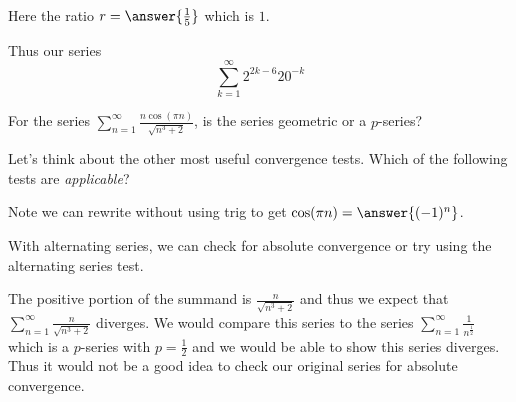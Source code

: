\documentclass{ximera}
\begin{document}
\begin{exercise}
\begin{hint}
\begin{question}
\begin{multipleChoice}
\end{multipleChoice}

Here the ratio $r= \answer{\frac{1}{5}}$ which is  $1$. 

Thus our series
\[
\sum_{k=1}^{\infty} 2^{2k-6}20^{-k}
\]

\begin{multipleChoice}
\end{multipleChoice}

\end{question}

\begin{question}

For the series $\sum_{n=1}^{\infty} \frac{n\cos(\pi n)}{\sqrt{n^3+2}}$, is the series geometric or a $p$-series?

\begin{multipleChoice}
\end{multipleChoice}

Let's think about the other most useful convergence tests.  Which of the following tests are \emph{applicable}?

\begin{selectAll}
\end{selectAll}

Note we can rewrite without using trig to get $\cos(\pi n)=\answer{(-1)^n}$. 

With alternating series, we can check for absolute convergence or try using the alternating series test. 

The positive portion of the summand is $\frac{n}{\sqrt{n^3+2}}$ and thus we expect that $\sum^{\infty}_{n=1}\frac{n}{\sqrt{n^3+2}}$ diverges. We would compare this series to the series $\sum^{\infty}_{n=1}\frac{1}{n^{\frac{1}{2}}}$ which is a $p$-series with $p=\frac{1}{2}$ and we would be able to show this series diverges.  Thus it would not be a good idea to check our original series for absolute convergence.


\end{question}
\end{hint}
\end{exercise}
\end{document}
